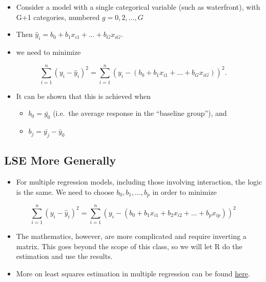 \documentclass[
  letterpaper,
  DIV=11,
  numbers=noendperiod]{scrreprt}
\providecommand{\tightlist}{%
  \setlength{\itemsep}{0pt}\setlength{\parskip}{0pt}}\usepackage{longtable,booktabs,array}
\begin{document}
\begin{itemize}
\item
  Consider a model with a single categorical variable (such as
  waterfront), with G+1 categories, numbered \(g=0,2, \ldots, G\)
\item
  Then \(\hat{y}_i = b_0 + b_1x_{i1} + \ldots +b_{G}x_{iG}\).
\item
  we need to minimize
\end{itemize}

\[
\displaystyle\sum_{i=1}^n(y_i-\hat{y}_i)^2 =\displaystyle\sum_{i=1}^n(y_i-(b_0 + b_1x_{i1} + \ldots +b_{G}x_{iG}))^2.   
\]

\begin{itemize}
\tightlist
\item
  It can be shown that this is achieved when

  \begin{itemize}
  \tightlist
  \item
    \(b_0 = \bar{y_0}\) (i.e.~the average response in the ``baseline
    group''), and\\
  \item
    \(b_j = \bar{y_j} - \bar{y}_0\)
  \end{itemize}
\end{itemize}

\subsection{LSE More Generally}\label{lse-more-generally}

\begin{itemize}
\tightlist
\item
  For multiple regression models, including those involving interaction,
  the logic is the same. We need to choose \(b_0, b_1, \ldots, b_p\) in
  order to minimize
\end{itemize}

\[ \displaystyle\sum_{i=1}^n (y_i -\hat{y}_i)^2  = \displaystyle\sum_{i=1}^n (y_i -(b_0 + b_1x_{i1} + b_2x_{i2} + \ldots + b_px_{ip}))^2 \]

\begin{itemize}
\item
  The mathematics, however, are more complicated and require inverting a
  matrix. This goes beyond the scope of this class, so we will let R do
  the estimation and use the results.
\item
  More on least squares estimation in multiple regression can be found
  \href{http://www.math.chalmers.se/Stat/Grundutb/GU/MSG500/A10/lecture5.pdf}{here}.
\end{itemize}
\end{document}
